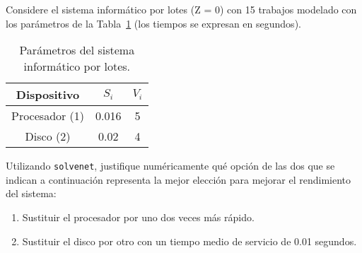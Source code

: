 \begin{ejercicio}\label{ej:5.19}
    Considere el sistema informático por lotes (Z = 0) con 15 trabajos modelado con los parámetros de la Tabla~\ref{tab:5.19}
    (los tiempos se expresan en segundos).
    \begin{table}[h]
        \centering
        \begin{tabular}{|c|c|c|}
            \hline
            Dispositivo & $S_i$ & $V_i$ \\
            \hline
            Procesador (1) & 0.016 & 5 \\
            Disco (2) & 0.02 & 4 \\
            \hline
        \end{tabular}
        \caption{Parámetros del sistema informático por lotes.}
        \label{tab:5.19}
    \end{table}
    Utilizando \verb|solvenet|, justifique numéricamente qué opción de las dos que se indican a continuación representa la mejor elección para mejorar el rendimiento del sistema:
    \begin{enumerate}
        \item Sustituir el procesador por uno dos veces más rápido.
        \item Sustituir el disco por otro con un tiempo medio de servicio de 0.01 segundos.
    \end{enumerate}
\end{ejercicio}
\begin{comment}
\solucion
    Ambas opciones sobre el sistema ofrecen el mismo grado de mejora en el rendimiento del sistema. Se trata de un sistema equilibrado (todas los dispositivos tienen la misma demanda de servicio). Se debe comprobar mediante \verb|solvenet| que tanto el tiempo de respuesta del servidor, como su productividad como los límites asintóticos son los mismos con ambas mejoras. Nótese que, sin embargo, el punto teórico de saturación (knee point) es menor en ambos casos que el del sistema original sin mejora.
\end{comment}

